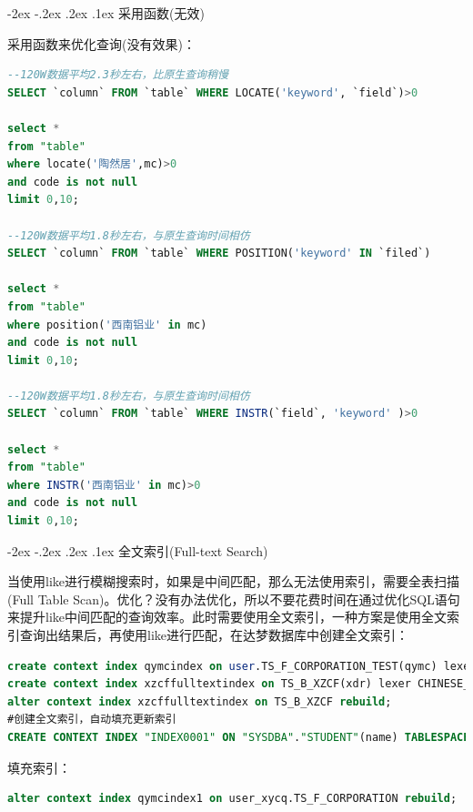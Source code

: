 \documentclass[12pt]{book}
\makeatletter
\numberwithin{dummy}{section}
\theoremstyle{ocrenumbox}
\theoremstyle{blacknumex}
\theoremstyle{blacknumbox}
\theoremstyle{ocrenum}
\renewcommand\paragraph{\@startsection{paragraph}{4}{\z@}
	{-2ex \@plus-.2ex \@minus .2ex}
	{.1ex}
	{\normalfont\small\sffamily\bfseries}}
\makeatother
\begin{document}
\paragraph{采用函数(无效)}

采用函数来优化查询(没有效果)：

\begin{lstlisting}[language=SQL]
--120W数据平均2.3秒左右，比原生查询稍慢
SELECT `column` FROM `table` WHERE LOCATE('keyword', `field`)>0

select * 
from "table" 
where locate('陶然居',mc)>0
and code is not null
limit 0,10;

--120W数据平均1.8秒左右，与原生查询时间相仿
SELECT `column` FROM `table` WHERE POSITION('keyword' IN `filed`)

select * 
from "table" 
where position('西南铝业' in mc)
and code is not null
limit 0,10;

--120W数据平均1.8秒左右，与原生查询时间相仿
SELECT `column` FROM `table` WHERE INSTR(`field`, 'keyword' )>0

select * 
from "table" 
where INSTR('西南铝业' in mc)>0
and code is not null
limit 0,10;
\end{lstlisting}

\paragraph{全文索引(Full-text Search)}

当使用like进行模糊搜索时，如果是中间匹配，那么无法使用索引，需要全表扫描(Full Table Scan)。优化？没有办法优化，所以不要花费时间在通过优化SQL语句来提升like中间匹配的查询效率。此时需要使用全文索引，一种方案是使用全文索引查询出结果后，再使用like进行匹配，在达梦数据库中创建全文索引：

\begin{lstlisting}[language=SQL]
create context index qymcindex on user.TS_F_CORPORATION_TEST(qymc) lexer CHINESE_VGRAM_LEXER;
create context index xzcffulltextindex on TS_B_XZCF(xdr) lexer CHINESE_VGRAM_LEXER;
alter context index xzcffulltextindex on TS_B_XZCF rebuild;
#创建全文索引，自动填充更新索引
CREATE CONTEXT INDEX "INDEX0001" ON "SYSDBA"."STUDENT"(name) TABLESPACE "MAIN" LEXER CHINESE_LEXER  SYNC TRANSACTION;
\end{lstlisting}

填充索引：

\begin{lstlisting}[language=SQL]
alter context index qymcindex1 on user_xycq.TS_F_CORPORATION rebuild;
\end{lstlisting}
\end{document}
